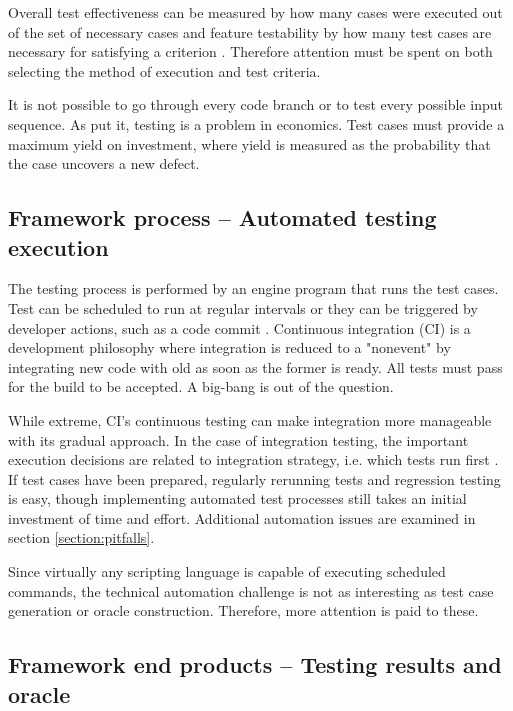 \documentclass[12pt,a4paper,oneside,pdftex]{report}
\begin{document}
{Overall test effectiveness can be measured by how many cases were executed out of the set of necessary cases and feature testability by how many test cases are necessary for satisfying a criterion \citep{linnenkugel1990test}. Therefore attention must be spent on both selecting the method of execution and test criteria. 

It is not possible to go through every code branch or to test every possible input sequence. As \citet{myers1976software} put it, testing is a problem in economics. Test cases must provide a maximum yield on investment, where yield is measured as the probability that the case uncovers a new defect. \citep{myers1976software}

\subsection{Framework process -- Automated testing execution}

The testing process is performed by an engine program that runs the test cases. Test can be scheduled to run at regular intervals or they can be triggered by developer actions, such as a code commit \citep{pezze2008software}. Continuous integration (CI) is a development philosophy where integration is reduced to a "nonevent" by integrating new code with old as soon as the former is ready. All tests must pass for the build to be accepted. \citep{duvall2007continuous} A big-bang is out of the question. 

While extreme, CI's continuous testing can make integration more manageable with its gradual approach. In the case of integration testing, the important execution decisions are related to integration strategy, i.e. which tests run first \citep{duvall2007continuous}. If test cases have been prepared, regularly rerunning tests and regression testing is easy, though implementing automated test processes still takes an initial investment of time and effort. Additional automation issues are examined in section \ref{section:pitfalls}.

Since virtually any scripting language is capable of executing scheduled commands, the technical automation challenge is not as interesting as test case generation or oracle construction. Therefore, more attention is paid to these.

\subsection{Framework end products -- Testing results and oracle}

}
\end{document}
